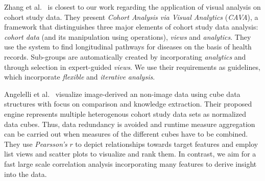 \documentclass[journal]{style/vgtc} 			          %
\begin{document}
Zhang et al.~\cite{Zhang2014, Gotz2014} is closest to our work regarding the application of visual analysis on cohort study data.
They present \emph{Cohort Analysis via Visual Analytics} (\emph{CAVA}), a framework that distinguishes three major elements of cohort study data analysis: \emph{cohort data} (and its manipulation using operations), \emph{views} and \emph{analytics}.
They use the system to find longitudinal pathways for diseases on the basis of health records.
Sub-groups are automatically created by incorporating \emph{analytics} and through selection in expert-guided \emph{views}.
We use their requirements as guidelines, which incorporate \emph{flexible} and \emph{iterative analysis}. %

Angelelli et al.~\cite{Angelelli} visualize image-derived an non-image data using cube data structures with focus on comparison and knowledge extraction.
Their proposed engine represents multiple heterogenous cohort study data sets as normalized data cubes.
Thus, data redundancy is avoided and runtime measure aggregation can be carried out when measures of the different cubes have to be combined.
They use \emph{Pearsson's} $r$ to depict relationships towards target features and employ list views and scatter plots to visualize and rank them.
In contrast, we aim for a fast large scale correlation analysis incorporating many features to derive insight into the data.
\end{document}
